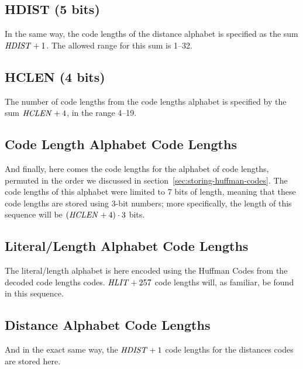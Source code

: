 \subsection{HDIST (5 bits)}

In the same way, the code lengths of the distance alphabet is
specified as the sum $\mathit{HDIST} + 1$. The allowed range for this sum
is 1--32.

\subsection{HCLEN (4 bits)}

The number of code lengths from the code lengths alphabet is specified
by the sum $\mathit{HCLEN} + 4$, in the range 4--19.

\subsection{Code Length Alphabet Code Lengths}

And finally, here comes the code lengths for the alphabet of code
lengths, permuted in the order we discussed in
section~\ref{sec:storing-huffman-codes}. The code lengths of this
alphabet were limited to 7 bits of length, meaning that these code
lengths are stored using 3-bit numbers; more specifically, the length
of this sequence will be $(\mathit{HCLEN} + 4) \cdot 3$ bits.

\subsection{Literal/Length Alphabet Code Lengths}

The literal/length alphabet is here encoded using the Huffman Codes
from the decoded code lengths codes. $\mathit{HLIT} + 257$ code lengths
will, as familiar, be found in this sequence.

\subsection{Distance Alphabet Code Lengths}

And in the exact same way, the $\mathit{HDIST} + 1$ code lengths for the
distances codes are stored here.
